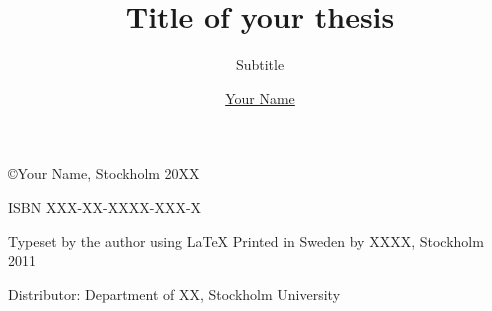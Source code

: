 \documentclass[twoside,11pt]{Latex/Classes/PhDthesisSU} %
\title{Title of your thesis}%
\subtitle{Subtitle}%
\author{\href{mailto:email@department.su.se}{Your Name}}
\begin{document}

\frontmatterSU

\halftitlepage


\maketitle  %



\newpage
\thispagestyle{empty}


\phantom{.}


{\selectfont 
{\scriptsize
\noindent
\copyright Your Name, Stockholm 20XX %
 
\vspace{5mm}
\noindent
ISBN XXX-XX-XXXX-XXX-X %

\vspace{5mm}
\noindent
Typeset by the author using \LaTeX \newline
Printed in Sweden by XXXX, Stockholm 2011 %

\noindent
Distributor: Department of XX, Stockholm University %
}
}
\cleardoublepage








\setcounter{secnumdepth}{2} %
\setcounter{tocdepth}{2}    %
\tableofcontents            %
\end{document}
